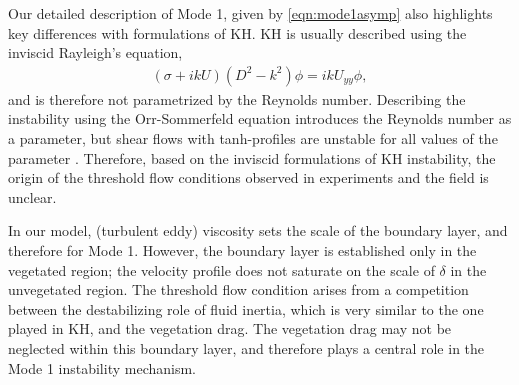 \documentclass{jfm}
\newcommand{\Ndg}{\tilde{N}_g}
\begin{document}
Our detailed description of Mode 1, given by \eqref{eqn:mode1asymp} also highlights key differences with formulations of KH. 
KH is usually described using the inviscid Rayleigh's equation, 
\begin{align}
\left(\sigma+ikU\right) \left(D^2-k^2\right)\phi =  ikU_{yy}\phi, 
\label{eqn:Rayleigh}
\end{align}
and is therefore not parametrized by the Reynolds number.
Describing the instability using the Orr-Sommerfeld equation introduces the Reynolds number as a parameter, but shear flows with tanh-profiles are unstable for all values of the parameter \citep{Drazin81}.
Therefore, based on the inviscid formulations of KH instability, the origin of the threshold flow conditions observed in experiments and the field is unclear.

In our model, (turbulent eddy) viscosity sets the scale of the boundary layer, and therefore for Mode 1.
However, the boundary layer is established only in the vegetated region; the velocity profile does not saturate on the scale of $\delta$ in the unvegetated region.
The threshold flow condition arises from a competition between the destabilizing role of fluid inertia, which is very similar to the one played in KH, and the vegetation drag.
The vegetation drag may not be neglected within this boundary layer, and therefore plays a central role in the Mode 1 instability mechanism.

\end{document}
